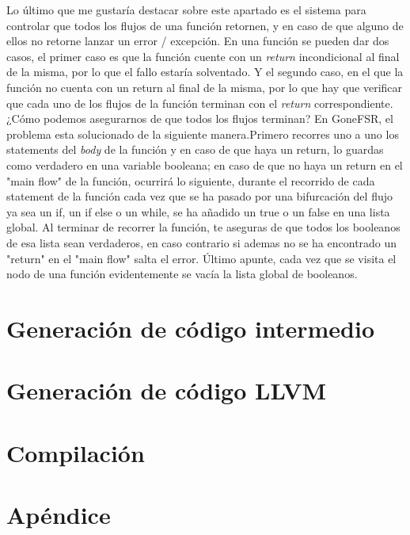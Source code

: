Lo último que me gustaría destacar sobre este apartado es el sistema para controlar que todos los flujos de una función retornen, y en caso de que alguno de ellos no retorne lanzar un error / excepción. En una función se pueden dar dos casos, el primer caso es que la función cuente con un \textit{return} incondicional al final de la misma, por lo que el fallo estaría solventado. Y el segundo caso, en el que la función no cuenta con un return al final de la misma, por lo que hay que verificar que cada uno de los flujos de la función terminan con el \textit{return} correspondiente. ¿Cómo podemos asegurarnos de que todos los flujos terminan? En GoneFSR, el problema esta solucionado de la siguiente manera.Primero recorres uno a uno los statements del \textit{body} de la función y en caso de que haya un return, lo guardas como verdadero en una variable booleana; en caso de que no haya un return en el "main flow" de la función, ocurrirá lo siguiente, durante el recorrido de cada statement de la función cada vez que se ha pasado por una bifurcación del flujo ya sea un if, un if else o un while, se ha añadido un true o un false en una lista global. Al terminar de recorrer la función, te aseguras de que todos los booleanos de esa lista sean verdaderos, en caso contrario si ademas no se ha encontrado un "return" en el "main flow" salta el error. Último apunte, cada vez que se visita el nodo de una función evidentemente se vacía la lista global de booleanos.
\section{Generación de código intermedio}
\section{Generación de código LLVM}
\section{Compilación}
\section{Apéndice}






